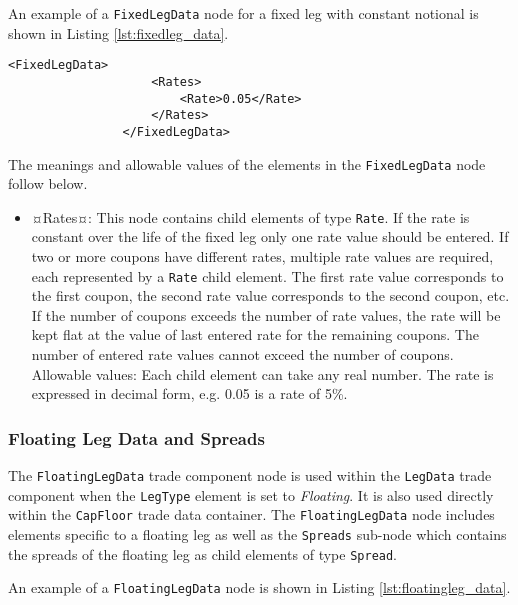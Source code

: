 An example of a \lstinline!FixedLegData! node for a fixed leg with constant notional is shown in Listing \ref{lst:fixedleg_data}.

{\footnotesize
\begin{lstlisting}[caption=FixedLegData, label=lst:fixedleg_data]
              <FixedLegData>
                    <Rates>
                        <Rate>0.05</Rate>
                    </Rates>
                </FixedLegData>
\end{lstlisting}
}

The meanings and allowable values of the elements in the \lstinline!FixedLegData! node follow below.

\begin{itemize}

\item ¤Rates¤: This node contains child elements of type \lstinline!Rate!. If the rate is constant over the life of the fixed leg only one rate value should be entered. If two or more coupons have different rates, multiple rate values are required, each represented by a \lstinline!Rate! child element. The first rate value corresponds to the first coupon, the second rate value corresponds to the second coupon, etc. If the number of coupons exceeds the number of rate values, the rate will be kept flat at the value of last entered rate for the remaining coupons.  The number of entered rate values cannot exceed the number of coupons. \\Allowable values: Each child element can take any  real number. The rate is expressed in decimal form, e.g. 0.05 is a rate of 5\%.
\end{itemize}




\subsubsection{Floating Leg Data and Spreads}
\label{ss:floatingleg_data}

The \lstinline!FloatingLegData! trade component node is used within the \lstinline!LegData! trade component when the \lstinline!LegType! element is set to \emph{Floating}. It is also used directly within the \lstinline!CapFloor! trade data container. 
The \lstinline!FloatingLegData! node includes elements specific to a floating leg as well as the \lstinline!Spreads! sub-node which contains the spreads of the floating leg as child elements of type \lstinline!Spread!.

An example of a \lstinline!FloatingLegData! node is shown in Listing \ref{lst:floatingleg_data}.

